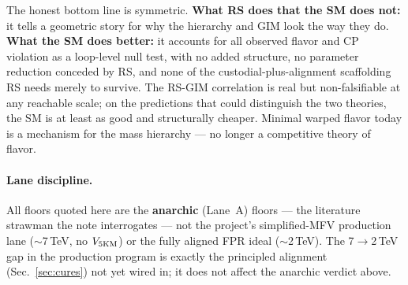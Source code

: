 \documentclass[11pt]{article}
\begin{document}
The honest bottom line is symmetric. \textbf{What RS does that the SM does not:} it
tells a geometric story for why the hierarchy and GIM look the way they do.
\textbf{What the SM does better:} it accounts for all observed flavor and CP
violation as a loop-level null test, with no added structure, no parameter
reduction conceded by RS, and none of the custodial-plus-alignment scaffolding RS
needs merely to survive. The RS-GIM correlation is real but non-falsifiable at any
reachable scale; on the predictions that could distinguish the two theories, the SM
is at least as good and structurally cheaper. Minimal warped flavor today is a
mechanism for the mass hierarchy --- no longer a competitive theory of flavor.

\paragraph{Lane discipline.} All floors quoted here are the \textbf{anarchic}
(Lane~A) floors --- the literature strawman the note interrogates --- not the
project's simplified-MFV production lane ($\sim$7\,TeV, no $V_{\rm 5KM}$) or the
fully aligned FPR ideal ($\sim$2\,TeV). The 7$\to$2\,TeV gap in the production
program is exactly the principled alignment (Sec.~\ref{sec:cures}) not yet wired in;
it does not affect the anarchic verdict above.
\end{document}
